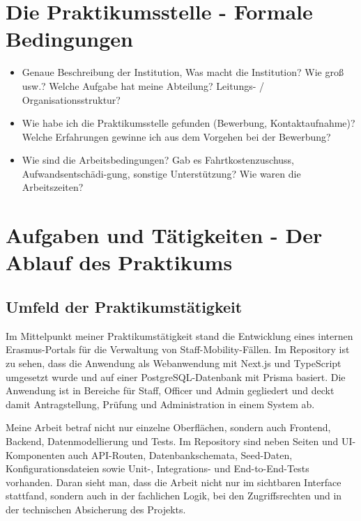 ﻿\documentclass{Vorlage}
\begin{document}
\section{Die Praktikumsstelle - Formale Bedingungen}

\begin{itemize}

\item Genaue Beschreibung der Institution, Was macht die Institution? Wie groß usw.? Welche Aufgabe hat meine Abteilung? Leitungs- / Organisationsstruktur?

\item Wie habe ich die Praktikumsstelle gefunden (Bewerbung, Kontaktaufnahme)? Welche Erfahrungen gewinne ich aus dem Vorgehen bei der Bewerbung?

\item Wie sind die Arbeitsbedingungen? Gab es Fahrtkostenzuschuss, Aufwandsentschädi-gung, sonstige Unterstützung? Wie waren die Arbeitszeiten?

\end{itemize}

\newpage

\section{Aufgaben und Tätigkeiten - Der Ablauf des Praktikums}

\renewcommand{\thesection}{\arabic{section}}

\subsection{Umfeld der Praktikumstätigkeit}

Im Mittelpunkt meiner Praktikumstätigkeit stand die Entwicklung eines internen Erasmus-Portals für die Verwaltung von Staff-Mobility-Fällen. Im Repository ist zu sehen, dass die Anwendung als Webanwendung mit Next.js und TypeScript umgesetzt wurde und auf einer PostgreSQL-Datenbank mit Prisma basiert. Die Anwendung ist in Bereiche für Staff, Officer und Admin gegliedert und deckt damit Antragstellung, Prüfung und Administration in einem System ab.

Meine Arbeit betraf nicht nur einzelne Oberflächen, sondern auch Frontend, Backend, Datenmodellierung und Tests. Im Repository sind neben Seiten und UI-Komponenten auch API-Routen, Datenbankschemata, Seed-Daten, Konfigurationsdateien sowie Unit-, Integrations- und End-to-End-Tests vorhanden. Daran sieht man, dass die Arbeit nicht nur im sichtbaren Interface stattfand, sondern auch in der fachlichen Logik, bei den Zugriffsrechten und in der technischen Absicherung des Projekts.
\end{document}
